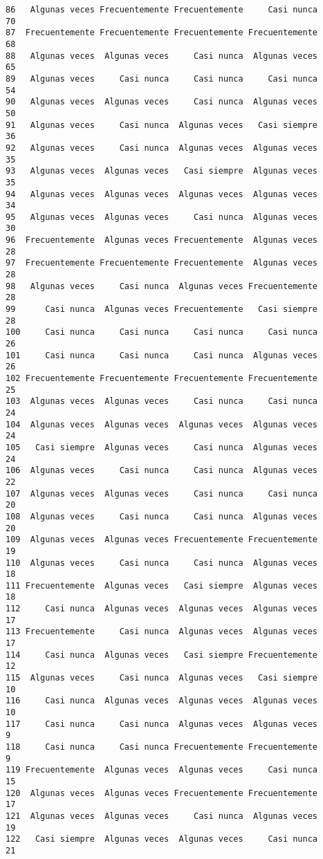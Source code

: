 \documentclass[
  letterpaper,
  DIV=11,
  numbers=noendperiod]{scrartcl}
\begin{document}
\begin{verbatim}
86   Algunas veces Frecuentemente Frecuentemente     Casi nunca      70
87  Frecuentemente Frecuentemente Frecuentemente Frecuentemente      68
88   Algunas veces  Algunas veces     Casi nunca  Algunas veces      65
89   Algunas veces     Casi nunca     Casi nunca     Casi nunca      54
90   Algunas veces  Algunas veces     Casi nunca  Algunas veces      50
91   Algunas veces     Casi nunca  Algunas veces   Casi siempre      36
92   Algunas veces     Casi nunca  Algunas veces  Algunas veces      35
93   Algunas veces  Algunas veces   Casi siempre  Algunas veces      35
94   Algunas veces  Algunas veces  Algunas veces  Algunas veces      34
95   Algunas veces  Algunas veces     Casi nunca  Algunas veces      30
96  Frecuentemente  Algunas veces Frecuentemente  Algunas veces      28
97  Frecuentemente Frecuentemente Frecuentemente  Algunas veces      28
98   Algunas veces     Casi nunca  Algunas veces Frecuentemente      28
99      Casi nunca  Algunas veces Frecuentemente   Casi siempre      28
100     Casi nunca     Casi nunca     Casi nunca     Casi nunca      26
101     Casi nunca     Casi nunca     Casi nunca  Algunas veces      26
102 Frecuentemente Frecuentemente Frecuentemente Frecuentemente      25
103  Algunas veces  Algunas veces     Casi nunca     Casi nunca      24
104  Algunas veces  Algunas veces  Algunas veces  Algunas veces      24
105   Casi siempre  Algunas veces     Casi nunca  Algunas veces      24
106  Algunas veces     Casi nunca     Casi nunca  Algunas veces      22
107  Algunas veces  Algunas veces     Casi nunca     Casi nunca      20
108  Algunas veces     Casi nunca     Casi nunca  Algunas veces      20
109  Algunas veces  Algunas veces Frecuentemente Frecuentemente      19
110  Algunas veces     Casi nunca     Casi nunca  Algunas veces      18
111 Frecuentemente  Algunas veces   Casi siempre  Algunas veces      18
112     Casi nunca  Algunas veces  Algunas veces  Algunas veces      17
113 Frecuentemente     Casi nunca  Algunas veces  Algunas veces      17
114     Casi nunca  Algunas veces   Casi siempre Frecuentemente      12
115  Algunas veces     Casi nunca  Algunas veces   Casi siempre      10
116     Casi nunca  Algunas veces  Algunas veces  Algunas veces      10
117     Casi nunca     Casi nunca  Algunas veces  Algunas veces       9
118     Casi nunca     Casi nunca Frecuentemente Frecuentemente       9
119 Frecuentemente  Algunas veces  Algunas veces     Casi nunca      15
120  Algunas veces  Algunas veces Frecuentemente Frecuentemente      17
121  Algunas veces  Algunas veces     Casi nunca  Algunas veces      19
122   Casi siempre  Algunas veces  Algunas veces     Casi nunca      21

\end{verbatim}
\end{document}

